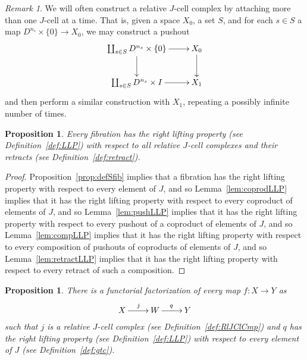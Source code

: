 \documentclass[12pt]{amsart}
\numberwithin{equation}{section}
\theoremstyle{slplain}
\newtheorem{prop}[equation]{Proposition}
\theoremstyle{definition}
\theoremstyle{remark}
\newtheorem{rem}[equation]{Remark}      %
\newcommand{\propref}{Proposition~\ref}
\newcommand{\lemref}{Lemma~\ref}
\newcommand{\defref}{Definition~\ref}
\begin{document}
\begin{rem}
  \label{rem:MultpleJCells}
  We will often construct a relative $J$-cell complex by attaching
  more than one $J$-cell at a time.  That is, given a space $X_{0}$, a
  set $S$, and for each $s \in S$ a map $D^{n_{s}}\times \{0\} \to
  X_{0}$, we may construct a pushout
  \begin{displaymath}
    \xymatrix{
      {\coprod_{s\in S} D^{n_{s}}\times \{0\}} \ar[r] \ar[d]
      & {X_{0}} \ar[d]\\
      {\coprod_{s\in S} D^{n_{s}}\times I} \ar[r]
      & {X_{1}}
    }
  \end{displaymath}
  and then perform a similar construction with $X_{1}$, repeating a
  possibly infinite number of times.
\end{rem}


\begin{prop}
  \label{prop:JClCmpLift}
  Every fibration has the right lifting property (see
  \defref{def:LLP}) with respect to all relative $J$-cell complexes
  and their retracts (see \defref{def:retract}).
\end{prop}

\begin{proof}
  \propref{prop:defSfib} implies that a fibration has the right
  lifting property with respect to every element of $J$, and so
  \lemref{lem:coprodLLP} implies that it has the right lifting
  property with respect to every coproduct of elements of $J$, and so
  \lemref{lem:pushLLP} implies that it has the right lifting property
  with respect to every pushout of a coproduct of elements of $J$, and
  so \lemref{lem:compLLP} implies that it has the right lifting
  property with respect to every composition of pushouts of coproducts
  of elements of $J$, and so \lemref{lem:retractLLP} implies that it
  has the right lifting property with respect to every retract of such
  a composition.
\end{proof}


\begin{prop}
  \label{prop:TrivCofFact}
  There is a functorial factorization of every map $f\colon X \to Y$
  as
  \begin{displaymath}
    \xymatrix{
      {X} \ar[r]^{j}
      & {W} \ar[r]^{q}
      & {Y}
    }
  \end{displaymath}
  such that $j$ is a relative $J$-cell complex (see
  \defref{def:RlJClCmp}) and $q$ has the right lifting property (see
  \defref{def:LLP}) with respect to every element of $J$ (see
  \defref{def:gtc}).
\end{prop}
\end{document}
